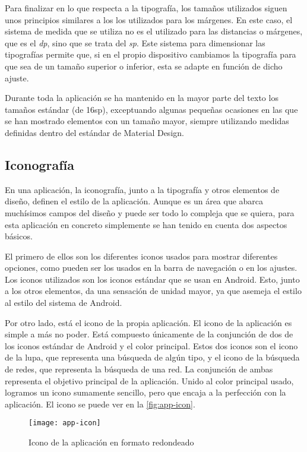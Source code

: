 Para finalizar en lo que respecta a la tipografía, los tamaños utilizados siguen unos principios similares a los los utilizados para los márgenes. En este caso, el sistema de medida que se utiliza no es el utilizado para las distancias o márgenes, que es el \textit{dp}, sino que se trata del \textit{sp}. Este sistema para dimensionar las tipografías permite que, si en el propio dispositivo cambiamos la tipografía para que sea de un tamaño superior o inferior, esta se adapte en función de dicho ajuste.

Durante toda la aplicación se ha mantenido en la mayor parte del texto los tamaños estándar (de 16sp), exceptuando algunas pequeñas ocasiones en las que se han mostrado elementos con un tamaño mayor, siempre utilizando medidas definidas dentro del estándar de Material Design.

\subsection{Iconografía}

En una aplicación, la iconografía, junto a la tipografía y otros elementos de diseño, definen el estilo de la aplicación. Aunque es un área que abarca muchísimos campos del diseño y puede ser todo lo compleja que se quiera, para esta aplicación en concreto simplemente se han tenido en cuenta dos aspectos básicos.

El primero de ellos son los diferentes iconos usados para mostrar diferentes opciones, como pueden ser los usados en la barra de navegación o en los ajustes. Los iconos utilizados son los iconos estándar que se usan en Android. Esto, junto a los otros elementos, da una sensación de unidad mayor, ya que asemeja el estilo al estilo del sistema de Android.

Por otro lado, está el icono de la propia aplicación. El icono de la aplicación es simple a más no poder. Está compuesto únicamente de la conjunción de dos de los iconos estándar de Android y el color principal. Estos dos iconos son el icono de la lupa, que representa una búsqueda de algún tipo, y el icono de la búsqueda de redes, que representa la búsqueda de una red. La conjunción de ambas representa el objetivo principal de la aplicación. Unido al color principal usado, logramos un icono sumamente sencillo, pero que encaja a la perfección con la aplicación. El icono se puede ver en la \autoref{fig:app-icon}.

\begin{figure}[H]
	\centering
	\texttt{[image: app-icon]}
	\caption{Icono de la aplicación en formato redondeado}
	\label{fig:app-icon}
\end{figure}

